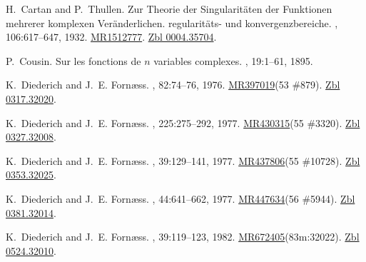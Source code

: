 \documentclass[11pt,a4paper, final, twoside]{article}
\numberwithin{equation}{section}
\begin{document}
\begin{appendices}
\begin{thebibliography}{100}
H.~Cartan and P.~Thullen.
\newblock Zur {T}heorie der {S}ingularit\"aten der {F}unktionen mehrerer
  komplexen {V}er\"anderlichen. regularit\"ats- und konvergenzbereiche.
, 106:617--647, 1932.
\newblock \href{http://www.ams.org/mathscinet-getitem?mr=1512777}{MR1512777}.
  \href{http://zbmath.org/?q=an:0004.35704}{Zbl 0004.35704}.

P.~Cousin.
\newblock Sur les fonctions de $n$ variables complexes.
, 19:1--61, 1895.

K.~Diederich and J.~E. Forn{\ae}ss.
, 82:74--76,
  1976.
\newblock \href{http://www.ams.org/mathscinet-getitem?mr=397019}{MR397019}(53
  \#879). \href{http://zbmath.org/?q=an:0317.32020}{Zbl 0317.32020}.

K.~Diederich and J.~E. Forn{\ae}ss.
, 225:275--292, 1977.
\newblock \href{http://www.ams.org/mathscinet-getitem?mr=430315}{MR430315}(55
  \#3320). \href{http://zbmath.org/?q=an:0327.32008}{Zbl 0327.32008}.

K.~Diederich and J.~E. Forn{\ae}ss.
, 39:129--141, 1977.
\newblock \href{http://www.ams.org/mathscinet-getitem?mr=437806}{MR437806}(55
  \#10728). \href{http://zbmath.org/?q=an:0353.32025}{Zbl 0353.32025}.

K.~Diederich and J.~E. Forn{\ae}ss.
, 44:641--662, 1977.
\newblock \href{http://www.ams.org/mathscinet-getitem?mr=447634}{MR447634}(56
  \#5944). \href{http://zbmath.org/?q=an:0381.32014}{Zbl 0381.32014}.

K.~Diederich and J.~E. Forn{\ae}ss.
, 39:119--123, 1982.
\newblock
  \href{http://www.ams.org/mathscinet-getitem?mr=672405}{MR672405}(83m:32022).
  \href{http://zbmath.org/?q=an:0524.32010}{Zbl 0524.32010}.


\end{thebibliography}
\end{appendices}
\end{document}
